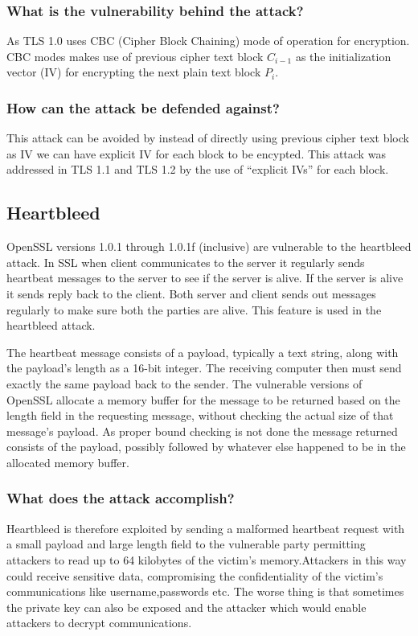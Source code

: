 \documentclass{article}
\begin{document}
\subsubsection{What is the vulnerability behind the attack?}
\indent \indent As TLS 1.0 uses CBC (Cipher Block Chaining) mode of operation for encryption. CBC modes makes use of previous cipher text block $C_{i-1}$ as the initialization vector (IV) for encrypting the next plain text block $P_i$.

\subsubsection{How can the attack be defended against?}
\indent \indent This attack can be avoided by instead of directly using previous cipher text block as IV we can have explicit IV for each block to be encypted. This attack was addressed in TLS 1.1 and TLS 1.2 by the use of “explicit IVs” for each block.

\subsection{Heartbleed}

\indent \indent OpenSSL versions 1.0.1 through 1.0.1f (inclusive) are vulnerable to the heartbleed attack.
In SSL when client communicates to the server it regularly sends heartbeat messages to the server to see if the server is alive. If the server is alive it sends reply back to the client. Both server and client sends out messages regularly to make sure both the parties are alive. This feature is used in the heartbleed attack.

The heartbeat message consists of a payload, typically a text string, along with the payload's length as a 16-bit integer. The receiving computer then must send exactly the same payload back to the sender. The vulnerable versions of OpenSSL allocate a memory buffer for the message to be returned based on the length field in the requesting message, without checking the actual size of that message's payload. As proper bound checking is not done the message returned consists of the payload, possibly followed by whatever else happened to be in the allocated memory buffer.

\subsubsection{What does the attack accomplish?}
\indent \indent Heartbleed is therefore exploited by sending a malformed heartbeat request with a small payload and large length field to the vulnerable party permitting attackers to read up to 64 kilobytes of the victim's memory.Attackers in this way could receive sensitive data, compromising the confidentiality of the victim's communications like username,passwords etc. The worse thing is that sometimes the private key can also be exposed and the attacker which would enable attackers to decrypt communications.
\end{document}
